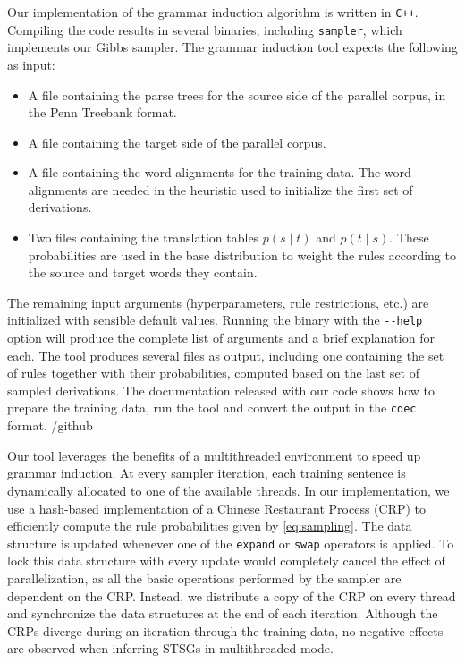 \documentclass[nofonts]{pbml} %
\begin{document}
Our implementation of the grammar induction algorithm is written in \texttt{C++}. Compiling the code results in several binaries, including \texttt{sampler}, which implements our Gibbs sampler. The grammar induction tool expects the following as input:
\begin{itemize}
\item A file containing the parse trees for the source side of the parallel corpus, in the Penn Treebank format.
\item A file containing the target side of the parallel corpus.
\item A file containing the word alignments for the training data. The word alignments are needed in the heuristic \citep{Galley2004} used to initialize the first set of derivations.
\item Two files containing the translation tables $p(s \mid t)$ and $p(t \mid s)$. These probabilities are used in the base distribution to weight the rules according to the source and target words they contain.
\end{itemize}
The remaining input arguments (hyperparameters, rule restrictions, etc.) are initialized with sensible default values. Running the binary with the \texttt{-{}-help} option will produce the complete list of arguments and a brief explanation for each. The tool produces several files as output, including one containing the set of rules together with their probabilities, computed based on the last set of sampled derivations. The documentation released with our code shows how to prepare the training data, run the tool and convert the output in the \texttt{cdec} format.
/github

Our tool leverages the benefits of a multithreaded environment to speed up grammar induction. At every sampler iteration, each training sentence is dynamically allocated to one of the available threads. In our implementation, we use a hash-based implementation of a Chinese Restaurant Process (CRP) \citep{Teh2010} to efficiently compute the rule probabilities given by \autoref{eq:sampling}. The data structure is updated whenever one of the \texttt{expand} or \texttt{swap} operators is applied. To lock this data structure with every update would completely cancel the effect of parallelization, as all the basic operations performed by the sampler are dependent on the CRP. Instead, we distribute a copy of the CRP on every thread and synchronize the data structures at the end of each iteration. Although the CRPs diverge during an iteration through the training data, no negative effects are observed when inferring STSGs in multithreaded mode.
\end{document}

